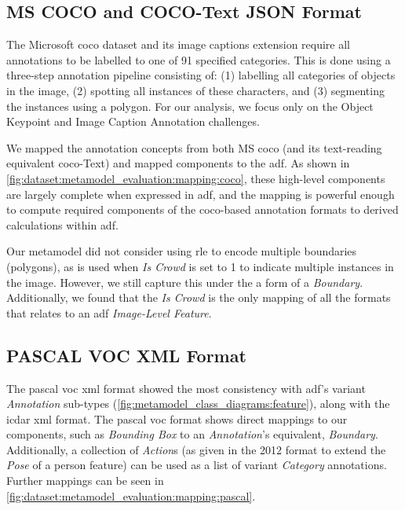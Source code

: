 \subsection{MS COCO and COCO-Text JSON Format}

The Microsoft \gls{coco} \citep{Lin:2014vma} dataset and its image captions extension \citep{Chen:2015ur} require all annotations to be labelled to one of 91 specified categories. This is done using a three-step annotation pipeline consisting of: (1) labelling all categories of objects in the image, (2) spotting all instances of these characters, and (3) segmenting the instances using a polygon. For our analysis, we focus only on the Object Keypoint and Image Caption Annotation challenges.

We mapped the annotation concepts from both MS \gls{coco} (and its text-reading equivalent \gls{coco}-Text) and mapped components to the \gls{adf}. As shown in \cref{fig:dataset:metamodel_evaluation:mapping:coco}, these high-level components are largely complete when expressed in \gls{adf}, and the mapping is powerful enough to compute required components of the \gls{coco}-based annotation formats to derived calculations within \gls{adf}.

Our metamodel did not consider using \gls{rle} to encode multiple boundaries (polygons), as is used when \textit{Is Crowd} is set to 1 to indicate multiple instances in the image. However, we still capture this under the a form of a \textit{Boundary}. Additionally, we found that the \textit{Is Crowd} is the only mapping of all the formats that relates to an \gls{adf} \textit{Image-Level Feature}.

\subsection{PASCAL VOC XML Format}

The \gls{pascal} \gls{voc} \gls{xml} format showed the most consistency with \gls{adf}'s variant \textit{Annotation} sub-types (\cref{fig:metamodel_class_diagrams:feature}), along with the \gls{icdar} \gls{xml} format. The \gls{pascal} \gls{voc} format shows direct mappings to our components, such as \textit{Bounding Box} to an \textit{Annotation}'s equivalent, \textit{Boundary}. Additionally, a collection of \textit{Action}s (as given in the 2012 format to extend the \textit{Pose} of a person feature) can be used as a list of variant \textit{Category} annotations. Further mappings can be seen in \cref{fig:dataset:metamodel_evaluation:mapping:pascal}.

